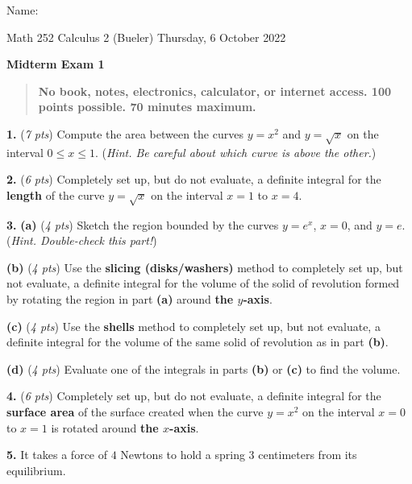 \documentclass[11pt]{amsart}
\newcommand{\ds}{\displaystyle}
\newcommand{\prob}[1]{\bigskip\noindent\textbf{#1.} }
\newcommand{\pts}[1]{(\emph{#1 pts})}
\newcommand{\probpts}[2]{\prob{#1} \pts{#2} \quad}
\newcommand{\ppartpts}[2]{\textbf{(#1)} \pts{#2} \quad}
\newcommand{\epartpts}[2]{\medskip\noindent \textbf{(#1)} \pts{#2} \quad}
\begin{document}
\hfill \Large Name:\underline{\phantom{Ed Bueler really really long long long name}}
\medskip

\scriptsize \noindent Math 252 Calculus 2 (Bueler) \hfill Thursday, 6 October 2022
\medskip

\LARGE\centerline{\textbf{Midterm Exam 1}}

\smallskip
\begin{quote}
\large
\textbf{No book, notes, electronics, calculator, or internet access.  100 points possible.  70 minutes maximum.}
\end{quote}

\normalsize
\medskip

\thispagestyle{empty}

\probpts{1}{7}  Compute the area between the curves $y=x^2$ and $y=\sqrt{x}$ on the interval $0\le x \le 1$. \quad (\emph{Hint.  Be careful about which curve is above the other.})
\vfill

\probpts{2}{6}  Completely set up, but do not evaluate, a definite integral for the \textbf{length} of the curve $\ds y=\sqrt{x}$ on the interval $x=1$ to $x=4$.
\vfill

\clearpage\newpage
\prob{3}  \ppartpts{a}{4} Sketch the region bounded by the curves $y=e^x$, $x=0$, and $y=e$. \quad (\emph{Hint.  Double-check this part!})

\vfill

\epartpts{b}{4} Use the \textbf{slicing (disks/washers)} method to completely set up, but not evaluate, a definite integral for the volume of the solid of revolution formed by rotating the region in part \textbf{(a)} around \textbf{the $y$-axis}.

\vspace{1.2in}

\epartpts{c}{4} Use the \textbf{shells} method to completely set up, but not evaluate, a definite integral for the volume of the same solid of revolution as in part \textbf{(b)}.

\vspace{1.2in}

\epartpts{d}{4} Evaluate one of the integrals in parts \textbf{(b)} or \textbf{(c)} to find the volume.
\vfill

\clearpage\newpage
\probpts{4}{6}  Completely set up, but do not evaluate, a definite integral for the \textbf{surface area} of the surface created when the curve $\ds y=x^2$ on the interval $x=0$ to $x=1$ is rotated around \textbf{the $x$-axis}.
\vfill

\prob{5} It takes a force of $4$ Newtons to hold a spring $3$ centimeters from its equilibrium.
\end{document}
